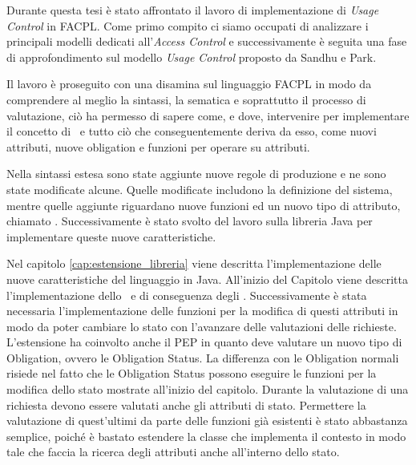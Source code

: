 \label{cap:conclusioni}
Durante questa tesi è stato affrontato il lavoro di implementazione di \textit{Usage Control} in \ac{FACPL}.
Come primo compito ci siamo occupati di analizzare i principali modelli dedicati all'\textit{Access Control} e successivamente è seguita una fase di approfondimento sul modello \textit{Usage Control} proposto da Sandhu e Park.  \par
Il lavoro è proseguito con una disamina sul linguaggio \ac{FACPL} in modo da comprendere al meglio la sintassi, la sematica e soprattutto il processo di valutazione, ciò ha permesso di sapere come, e dove, intervenire per implementare il concetto di \status \ e tutto ciò che conseguentemente deriva da esso, come nuovi attributi, nuove obligation e funzioni per operare su attributi. \par
Nella sintassi estesa sono state aggiunte nuove regole di produzione e ne sono state modificate alcune. Quelle modificate includono la definizione del sistema, mentre quelle aggiunte riguardano nuove funzioni ed un nuovo tipo di attributo, chiamato \statusattribute.
Successivamente è stato svolto del lavoro sulla libreria Java per implementare queste nuove caratteristiche. \par
Nel capitolo \ref{cap:estensione_libreria} viene descritta l'implementazione delle nuove caratteristiche del linguaggio in Java. All'inizio del Capitolo viene descritta l'implementazione dello \status \ e di conseguenza degli \statusattribute. Successivamente è stata necessaria  l'implementazione  delle funzioni per la modifica di questi attributi in modo da poter cambiare lo stato con l'avanzare delle valutazioni delle richieste. L'estensione ha coinvolto anche il \ac{PEP} in quanto deve valutare un nuovo tipo di Obligation, ovvero le Obligation Status.
La differenza con le Obligation normali risiede nel fatto che le Obligation Status possono eseguire le funzioni per la modifica dello stato mostrate all'inizio del capitolo.
Durante la valutazione di una richiesta devono essere valutati anche gli attributi di stato. Permettere la valutazione di quest'ultimi da parte delle funzioni già esistenti è stato abbastanza semplice, poiché è bastato estendere la classe che implementa il contesto in modo tale che faccia la ricerca degli attributi anche all'interno dello stato.\par
